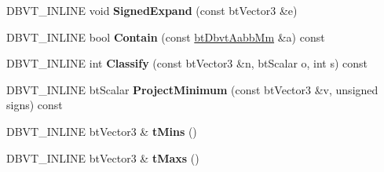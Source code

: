 \begin{DoxyCompactItemize}
\item 
\mbox{\label{structbtDbvtAabbMm_a182dddf6be4856c35c89057ff8a2d3ee}} 
D\+B\+V\+T\+\_\+\+I\+N\+L\+I\+NE void {\bfseries Signed\+Expand} (const bt\+Vector3 \&e)
\item 
\mbox{\label{structbtDbvtAabbMm_a12c31bd12f551773ab99d0ef46d5f533}} 
D\+B\+V\+T\+\_\+\+I\+N\+L\+I\+NE bool {\bfseries Contain} (const \hyperlink{structbtDbvtAabbMm}{bt\+Dbvt\+Aabb\+Mm} \&a) const
\item 
\mbox{\label{structbtDbvtAabbMm_a90e11fdfb7f049dcb55cb15d4565fc10}} 
D\+B\+V\+T\+\_\+\+I\+N\+L\+I\+NE int {\bfseries Classify} (const bt\+Vector3 \&n, bt\+Scalar o, int s) const
\item 
\mbox{\label{structbtDbvtAabbMm_a083b04e78a333d020cfcd5446a0a00ef}} 
D\+B\+V\+T\+\_\+\+I\+N\+L\+I\+NE bt\+Scalar {\bfseries Project\+Minimum} (const bt\+Vector3 \&v, unsigned signs) const
\item 
\mbox{\label{structbtDbvtAabbMm_ad920901ffab4ca5cad8692e71aca0399}} 
D\+B\+V\+T\+\_\+\+I\+N\+L\+I\+NE bt\+Vector3 \& {\bfseries t\+Mins} ()
\item 
\mbox{\label{structbtDbvtAabbMm_a96df1c148eecb1df8be67d9b7271f2da}} 
D\+B\+V\+T\+\_\+\+I\+N\+L\+I\+NE bt\+Vector3 \& {\bfseries t\+Maxs} ()
\end{DoxyCompactItemize}
